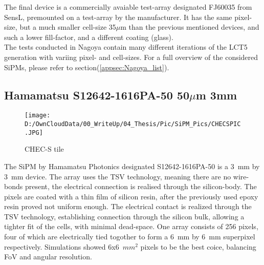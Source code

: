 \documentclass[12pt,article,type=msc,colorback,accentcolor=tud9c]{tudthesis}
\begin{document}
The final device is a commercially avaiable test-array designated FJ60035 from SensL, premounted on a test-array by the manufacturer. It has the same pixel-size, but a much smaller cell-size 35$\mu$m than the previous mentioned devices, and such a lower fill-factor, and a different coating (glass).\\

The tests conducted in Nagoya contain many different iterations of the LCT5 generation with variing pixel- and cell-sizes\cite{Hiro}.
For a full overview of the considered SiPMs, please refer to section(\ref{appsec:Nagoya_list}).



\clearpage
\subsection{Hamamatsu S12642-1616PA-50 50$\mu$m 3mm}
\begin{wrapfigure}{R}{0.3\textwidth}
\centering
\texttt{[image: D:/OwnCloudData/00\_WriteUp/04\_Thesis/Pic/SiPM\_Pics/CHECSPIC.JPG]}
\caption[CHEC-S SiPM]{\label{fig:CHECSTILE}CHEC-S tile}
\end{wrapfigure}
The SiPM by Hamamatsu Photonics designated S12642-1616PA-50 is a 3~mm by 3~mm device. The array uses the TSV technology, meaning there are no wire-bonds present, the electrical connection is realised through the silicon-body. The pixels are coated with a thin film of silicon resin, after the previously used epoxy resin proved not uniform enough. The electrical contact is realized through the TSV technology, establishing connection through the silicon bulk, allowing a tighter fit of the cells, with minimal dead-space. One array consists of 256 pixels, four of which are electrically tied togother to form a 6~mm by 6~mm superpixel respectively. Simulations showed 6x6~$mm^2$ pixels to be the best coice, balancing FoV and angular resolution.
\end{document}
